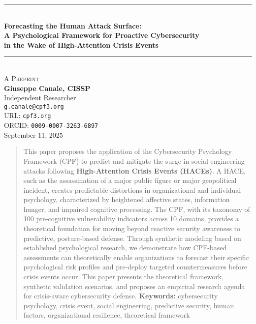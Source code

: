 \documentclass[11pt,a4paper]{article}
\begin{document}
\thispagestyle{empty}
\begin{center}
\rule{\textwidth}{1pt} \\[1.2cm]
{\LARGE \textbf{\textcolor{titlecolor}{Forecasting the Human Attack Surface:}}} \\[0.4cm]
{\LARGE \textbf{\textcolor{titlecolor}{A Psychological Framework for Proactive Cybersecurity}}} \\[0.4cm]
{\LARGE \textbf{\textcolor{titlecolor}{in the Wake of High-Attention Crisis Events}}} \\[1.2cm]
\rule{\textwidth}{1pt} \\[0.8cm]
{\large \textsc{A Preprint}} \\[1cm]
{\Large \textbf{Giuseppe Canale, CISSP}} \\[0.4cm]
Independent Researcher \\[0.3cm]
\texttt{g.canale@cpf3.org} \\[0.3cm]
URL: \texttt{cpf3.org} \\[0.3cm]
ORCID: \texttt{0009-0007-3263-6897} \\[1.2cm]
{\large September 11, 2025}
\end{center}

\begin{abstract}
\noindent
This paper proposes the application of the Cybersecurity Psychology Framework (CPF) to predict and mitigate the surge in social engineering attacks following \textbf{High-Attention Crisis Events (HACEs)}. A HACE, such as the assassination of a major public figure or major geopolitical incident, creates predictable distortions in organizational and individual psychology, characterized by heightened affective states, information hunger, and impaired cognitive processing. The CPF, with its taxonomy of 100 pre-cognitive vulnerability indicators across 10 domains, provides a theoretical foundation for moving beyond reactive security awareness to predictive, posture-based defense. Through synthetic modeling based on established psychological research, we demonstrate how CPF-based assessments can theoretically enable organizations to forecast their specific psychological risk profiles and pre-deploy targeted countermeasures before crisis events occur. This paper presents the theoretical framework, synthetic validation scenarios, and proposes an empirical research agenda for crisis-aware cybersecurity defense.
\vspace{0.5em}
\noindent\textbf{Keywords:} cybersecurity psychology, crisis event, social engineering, predictive security, human factors, organizational resilience, theoretical framework
\end{abstract}
\end{document}
